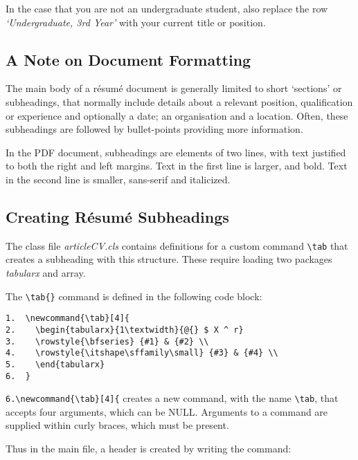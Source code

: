 In the case that you are not an undergraduate student, also replace the row \emph{`Undergraduate, 3rd Year'} with your current title or position. \par

\subsection{A Note on Document Formatting}
The main body of a r\'esum\'e document is generally limited to short `sections' or subheadings, that normally include details about a relevant position, qualification or experience and optionally a date; an organisation and a location. Often, these subheadings are followed by bullet-points providing more information. \par

In the PDF document, subheadings are elements of two lines, with text justified to both the right and left margins. Text in the first line is larger, and bold. Text in the second line is smaller, sans-serif and italicized. \par

\subsection{Creating R\'esum\'e Subheadings}
The class file \emph{articleCV.cls} contains definitions for a custom command \lstinline|\tab| that creates a subheading with this structure. These require loading two packages \emph{tabularx} and {array}. \par

The \lstinline|\tab{}| command is defined in the following code block: \par

\begin{lstlisting}
1.  \newcommand{\tab}[4]{
2.    \begin{tabularx}{1\textwidth}{@{} $ X ^ r}
3.    \rowstyle{\bfseries} {#1} & {#2} \\
4.    \rowstyle{\itshape\sffamily\small} {#3} & {#4} \\
5.    \end{tabularx}
6.  }
\end{lstlisting}

\lstinline|6.\newcommand{\tab}[4]{| creates a new command, with the name \lstinline|\tab|, that accepts four arguments, which can be NULL. Arguments to a command are supplied within curly braces, which must be present.

Thus in the main file, a header is created by writing the command: \par

